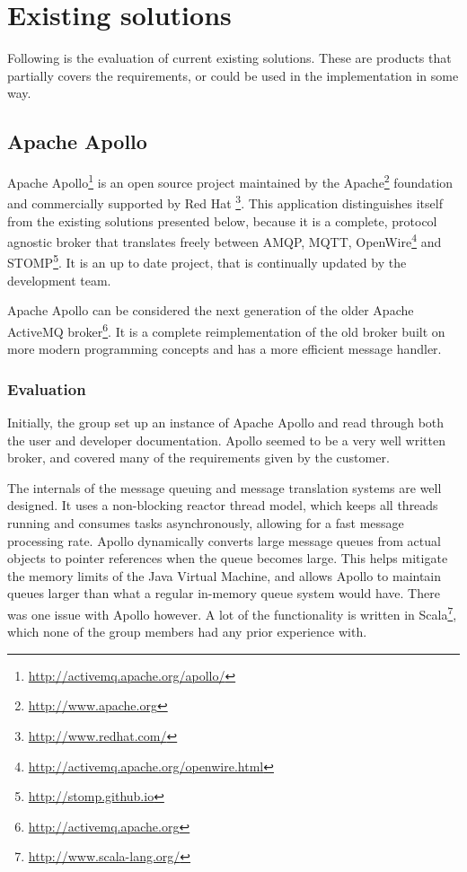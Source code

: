 \section{Existing solutions}
\label{subsec:prestudies-existing_solutions}

Following is the evaluation of current existing solutions. These are products that partially covers the requirements, or could be used in the implementation in some way.

\subsection{Apache Apollo}
\label{subsec:prestudies-existing_solutions-apache_apollo}

Apache Apollo\footnote{\url{http://activemq.apache.org/apollo/}} is an open source project maintained by the Apache\footnote{\url{http://www.apache.org}} foundation and commercially supported by Red Hat \footnote{\url{http://www.redhat.com/}}. This application distinguishes itself from the existing solutions presented below, because it is a complete, protocol agnostic broker that translates freely between AMQP, MQTT, OpenWire\footnote{\url{http://activemq.apache.org/openwire.html}} and STOMP\footnote{\url{http://stomp.github.io}}. It is an up to date project, that is continually updated by the development team.

Apache Apollo can be considered the next generation of the older Apache ActiveMQ broker\footnote{\url{http://activemq.apache.org}}. It is a complete reimplementation of the old broker built on more modern programming concepts and has a more efficient message handler.    

\subsubsection{Evaluation}
\label{subsec:prestudies-existing_solutions-apache_apollo-evaluation}

Initially, the group set up an instance of Apache Apollo and read through both the user and developer documentation. Apollo seemed to be a very well written broker, and covered many of the requirements given by the customer.

The internals of the message queuing and message translation systems are well designed. It uses a non-blocking reactor thread model, which keeps all threads running and consumes tasks asynchronously, allowing for a fast message processing rate. Apollo dynamically converts large message queues from actual objects to pointer references when the queue becomes large. This helps mitigate the memory limits of the Java Virtual Machine, and allows Apollo to maintain queues larger than what a regular in-memory queue system would have. There was one issue with Apollo however. A lot of the functionality is written in Scala\footnote{\url{http://www.scala-lang.org/}}, which none of the group members had any prior experience with.

